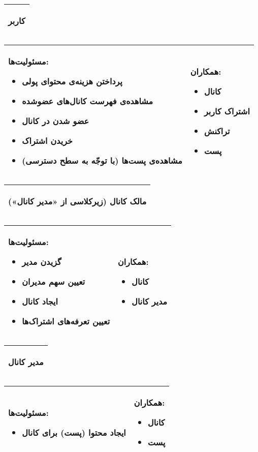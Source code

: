 \newcommand{\crccard}[3]{
    \begin{table}[H]
        \centering
        \begin{tabular}{||p{104mm}||}
            \hline
            \begin{center}
                \textbf{#1}
            \end{center}
            \\\hline
        \end{tabular}
        \begin{tabular}{||p{5cm}|p{5cm}||}
            
            مسئولیت‌ها:#2 & همکاران: #3 \\\hline
        \end{tabular}
    \end{table}
}

\crccard{کاربر}{
    \begin{itemize}
        \item پرداختن هزینه‌ی محتوای پولی
        \item مشاهده‌ی فهرست کانال‌های عضوشده
        \item عضو شدن در کانال
        \item خریدن اشتراک
        \item مشاهده‌ی پست‌ها (با توجّه به سطح دسترسی)
    \end{itemize}
}{
    \begin{itemize}
        \item کانال
        \item اشتراک کاربر
        \item تراکنش
        \item پست
    \end{itemize}
}

\crccard{مالک کانال (زیرکلاسی از «مدیر کانال»)}{
    \begin{itemize}
        \item گزیدن مدیر
        \item تعیین سهم مدیران
        \item ایجاد کانال
        \item تعیین تعرفه‌های اشتراک‌ها
    \end{itemize}
}{
    \begin{itemize}
        \item کانال
        \item مدیر کانال
    \end{itemize}
}

\crccard{مدیر کانال}{
    \begin{itemize}
        \item ایجاد محتوا (پست) برای کانال
    \end{itemize}
}{
    \begin{itemize}
        \item کانال
        \item پست
    \end{itemize}
}

